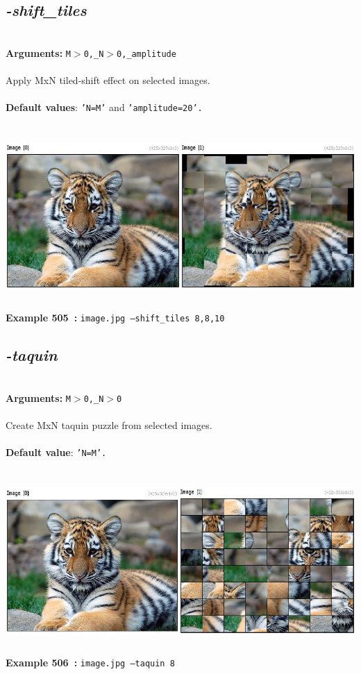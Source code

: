 \documentclass[a4paper,11pt,twoside]{book}
\begin{document}
\subsection{\emph{-shift\_tiles} }\vspace*{-0.5em}
~\\\textbf{Arguments: } 
{\small \texttt{M$>$0,\_N$>$0,\_amplitude}}\\~\\
Apply MxN tiled-shift effect on selected images.
~\\~\\\textbf{Default values}: {\small \texttt{'N=M'} and \texttt{'amplitude=20'.}}
\begin{center}\includegraphics[keepaspectratio=true,height=7cm,width=\textwidth]{img/gmic_def505.jpg}\\
{\footnotesize \textbf{Example 505~:} \texttt{image.jpg --shift\_tiles 8,8,10}}
\end{center}

\subsection{\emph{-taquin} }\vspace*{-0.5em}
~\\\textbf{Arguments: } 
{\small \texttt{M$>$0,\_N$>$0}}\\~\\
Create MxN taquin puzzle from selected images.
~\\~\\\textbf{Default value}: {\small \texttt{'N=M'.}}
\begin{center}\includegraphics[keepaspectratio=true,height=7cm,width=\textwidth]{img/gmic_def506.jpg}\\
{\footnotesize \textbf{Example 506~:} \texttt{image.jpg --taquin 8}}
\end{center}
\end{document}
